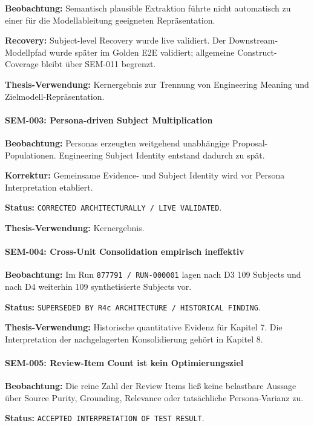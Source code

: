 \textbf{Beobachtung:}
Semantisch plausible Extraktion führte nicht automatisch zu einer für die
Modellableitung geeigneten Repräsentation.

\textbf{Recovery:}
Subject-level Recovery wurde live validiert. Der Downstream-Modellpfad wurde
später im Golden E2E validiert; allgemeine Construct-Coverage bleibt über
SEM-011 begrenzt.

\textbf{Thesis-Verwendung:}
Kernergebnis zur Trennung von Engineering Meaning und Zielmodell-Repräsentation.


\paragraph{SEM-003: Persona-driven Subject Multiplication}

\textbf{Beobachtung:}
Personas erzeugten weitgehend unabhängige Proposal-Populationen. Engineering
Subject Identity entstand dadurch zu spät.

\textbf{Korrektur:}
Gemeinsame Evidence- und Subject Identity wird vor Persona Interpretation
etabliert.

\textbf{Status:}
\texttt{CORRECTED ARCHITECTURALLY / LIVE VALIDATED}.

\textbf{Thesis-Verwendung:}
Kernergebnis.


\paragraph{SEM-004: Cross-Unit Consolidation empirisch ineffektiv}

\textbf{Beobachtung:}
Im Run \texttt{877791 / RUN-000001} lagen nach D3 109 Subjects und nach D4
weiterhin 109 synthetisierte Subjects vor.

\textbf{Status:}
\texttt{SUPERSEDED BY R4c ARCHITECTURE / HISTORICAL FINDING}.

\textbf{Thesis-Verwendung:}
Historische quantitative Evidenz für Kapitel 7. Die Interpretation der
nachgelagerten Konsolidierung gehört in Kapitel 8.


\paragraph{SEM-005: Review-Item Count ist kein Optimierungsziel}

\textbf{Beobachtung:}
Die reine Zahl der Review Items ließ keine belastbare Aussage über
Source Purity, Grounding, Relevance oder tatsächliche Persona-Varianz zu.

\textbf{Status:}
\texttt{ACCEPTED INTERPRETATION OF TEST RESULT}.

